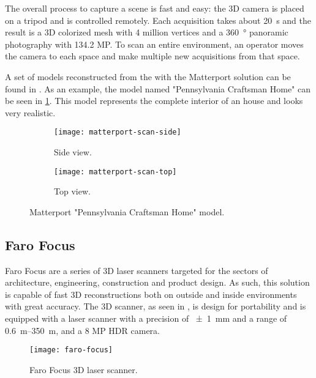 The overall process to capture a scene is fast and easy: the 3D camera is placed on a tripod and is controlled remotely. Each acquisition takes about \SI{20}{\second} and the result is a 3D colorized mesh with 4 million vertices and a \SI{360}{\degree} panoramic photography with 134.2 MP. To scan an entire environment, an operator moves the camera to each space and make multiple new acquisitions from that space.

A set of models reconstructed from the with the Matterport solution can be found in \cite{matterport-gallery}. As an example, the model named "Pennsylvania Craftsman Home" \cite{matterport-house} can be seen in \cref{fig:matterport-model}. This model represents the complete interior of an house and looks very realistic.

\begin{figure}[h]
    
    \centering
    \begin{subfigure}{\textwidth}
        \centering
        \texttt{[image: matterport-scan-side]}
        \caption{Side view.}
    \end{subfigure}

    \begin{subfigure}{\textwidth}
        \centering
        \texttt{[image: matterport-scan-top]}
        \caption{Top view.}
    \end{subfigure}

    \caption{Matterport "Pennsylvania Craftsman Home" model.}
    \label{fig:matterport-model}
\end{figure}

\subsection{Faro Focus}

Faro Focus \cite{faro-focus} are a series of 3D laser scanners targeted for the sectors of architecture, engineering, construction and product design. As such, this solution is capable of fast 3D reconstructions both on outside and inside environments with great accuracy. The 3D scanner, as seen in , is design for portability and is equipped with a laser scanner with a precision of \SI{+-1}{\milli\meter} and a range of \SIrange{0.6}{350}{\meter}, and a 8 MP HDR camera.

\begin{figure}[h]
    \centering
    \texttt{[image: faro-focus]}
    \caption{Faro Focus 3D laser scanner.}
    \label{fig:faro-focus}
\end{figure}

